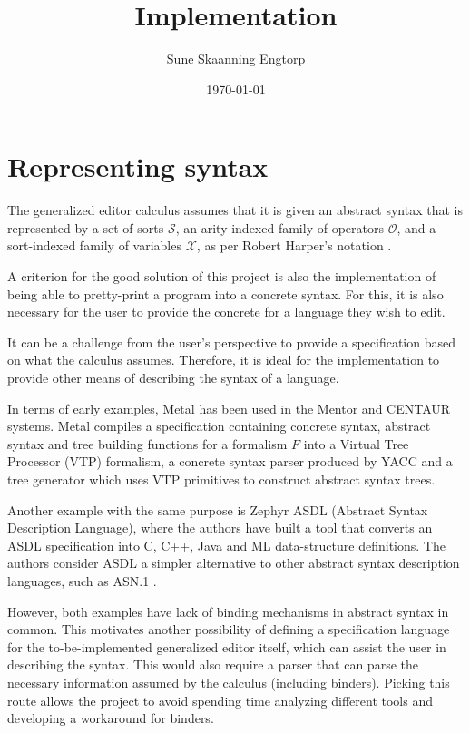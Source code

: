 \documentclass{article}
\title{Implementation}
\date{\today}
\author{Sune Skaanning Engtorp}
\begin{document}
\maketitle

\section{Representing syntax}

The generalized editor calculus\cite{aalborg} assumes that it is given an abstract syntax that is represented by a set of sorts $\mathcal{S}$, an arity-indexed family of operators $\mathcal{O}$, and a sort-indexed family of variables $\mathcal{X}$, as per Robert Harper's notation \cite{harper}.

A criterion for the good solution of this project is also the implementation of being able to pretty-print a program into a concrete syntax. For this, it is also necessary for the user to provide the concrete for a language they wish to edit.

It can be a challenge from the user's perspective to provide a specification based on what the calculus assumes. Therefore, it is ideal for the implementation to provide other means of describing the syntax of a language.

In terms of early examples, Metal\cite{metal} has been used in the Mentor \cite{mentor-applications} and CENTAUR \cite{centaur} systems. 
Metal compiles a specification containing concrete syntax, abstract syntax and tree building functions for a formalism $F$ into a Virtual Tree Processor (VTP) formalism, a concrete syntax parser produced by YACC\cite{yacc} and a tree generator which uses VTP primitives to construct abstract syntax trees.

Another example with the same purpose is Zephyr ASDL (Abstract Syntax Description Language)\cite{zephyr}, where the authors have built a tool that converts an ASDL specification into C, C++, Java and ML data-structure definitions. The authors consider ASDL a simpler alternative to other abstract syntax description languages, such as ASN.1 \cite{asn1}.

However, both examples have lack of binding mechanisms in abstract syntax in common. This motivates another possibility of defining a specification language for the to-be-implemented generalized editor itself, which can assist the user in describing the syntax. This would also require a parser that can parse the necessary information assumed by the calculus (including binders). Picking this route allows the project to avoid spending time analyzing different tools and developing a workaround for binders.
\end{document}
